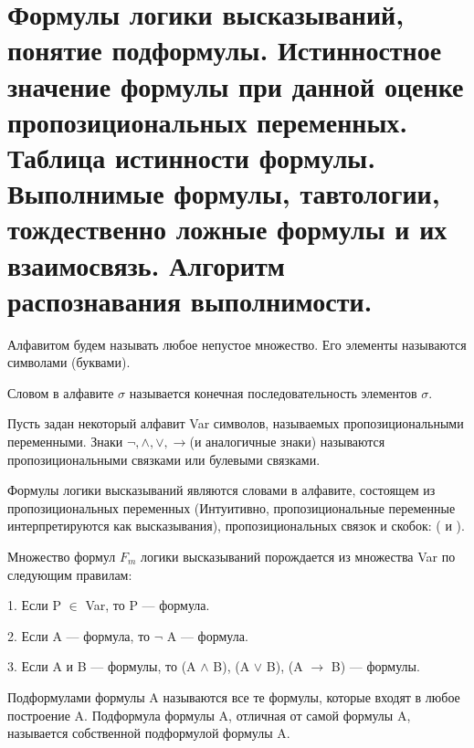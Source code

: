 \section[Формулы логики высказываний, понятие подформулы. Истинностное значение формулы при данной оценке
пропозициональных переменных. Таблица истинности формулы. Выполнимые формулы, тавтологии, тождественно ложные
формулы и их взаимосвязь. Алгоритм распознавания выполнимости.]{\sloppy Формулы логики высказываний, понятие
подформулы. Истинностное значение формулы при данной оценке пропозициональных переменных. Таблица истинности
формулы. Выполнимые формулы, тавтологии, тождественно ложные формулы и их взаимосвязь. Алгоритм распознавания
выполнимости.}

\begin{definition}
	Алфавитом будем называть любое непустое множество. Его элементы называются символами (буквами).
\end{definition}

\begin{definition}
	Словом в алфавите $\sigma$ называется конечная последовательность элементов $\sigma$.
\end{definition}

Пусть задан некоторый алфавит Var символов, называемых пропозициональными переменными. Знаки $\neg, \land, \lor,
\to$(и аналогичные знаки) называются пропозициональными связками или булевыми связками.

\begin{definition}
	Формулы логики высказываний являются словами в алфавите, состоящем из пропозициональных переменных (Интуитивно,
	пропозициональные переменные интерпретируются как высказывания), пропозициональных связок и скобок: ( и ).
\end{definition}

\begin{definition}
	Множество формул $F_m$ логики высказываний порождается из множества Var по следующим правилам:

	1. Если P $\in$ Var, то P — формула.

	2. Если A — формула, то $\neg$ A — формула.

	3. Если A и B — формулы, то (A $\land$ B), (A $\lor$ B), (A $\to$ B) — формулы.
\end{definition}

\begin{definition}
	Подформулами формулы A называются все те формулы, которые входят в любое построение A. Подформула формулы A,
	отличная от самой формулы A, называется собственной подформулой формулы A.
\end{definition}

